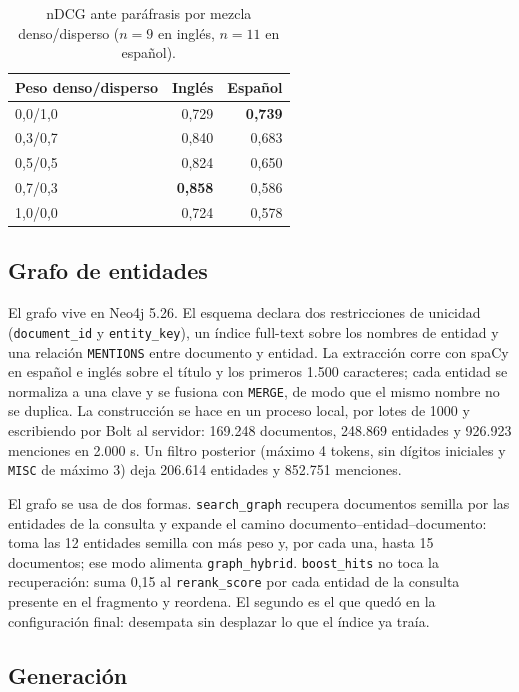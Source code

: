 \begin{table}[t]
\centering
\footnotesize
\caption{nDCG ante par\'afrasis por mezcla denso/disperso ($n=9$ en ingl\'es, $n=11$ en espa\~nol).}
\label{tab:parafrasis}
\begin{tabular}{lrr}
\toprule
Peso denso/disperso & Ingl\'es & Espa\~nol \\
\midrule
0,0/1,0 & 0,729 & \textbf{0,739} \\
0,3/0,7 & 0,840 & 0,683 \\
0,5/0,5 & 0,824 & 0,650 \\
0,7/0,3 & \textbf{0,858} & 0,586 \\
1,0/0,0 & 0,724 & 0,578 \\
\bottomrule
\end{tabular}
\end{table}

\subsection{Grafo de entidades}
\label{sec:grafo}

El grafo vive en Neo4j 5.26. El esquema declara dos restricciones de unicidad (\texttt{document\_id} y \texttt{entity\_key}), un \'indice full-text sobre los nombres de entidad y una relaci\'on \texttt{MENTIONS} entre documento y entidad. La extracci\'on corre con spaCy en espa\~nol e ingl\'es sobre el t\'itulo y los primeros 1.500 caracteres; cada entidad se normaliza a una clave y se fusiona con \texttt{MERGE}, de modo que el mismo nombre no se duplica. La construcci\'on se hace en un proceso local, por lotes de 1000 y escribiendo por Bolt al servidor: 169.248 documentos, 248.869 entidades y 926.923 menciones en 2.000 s. Un filtro posterior (m\'aximo 4 tokens, sin d\'igitos iniciales y \texttt{MISC} de m\'aximo 3) deja 206.614 entidades y 852.751 menciones.

El grafo se usa de dos formas. \texttt{search\_graph} recupera documentos semilla por las entidades de la consulta y expande el camino documento--entidad--documento: toma las 12 entidades semilla con m\'as peso y, por cada una, hasta 15 documentos; ese modo alimenta \texttt{graph\_hybrid}. \texttt{boost\_hits} no toca la recuperaci\'on: suma 0,15 al \texttt{rerank\_score} por cada entidad de la consulta presente en el fragmento y reordena. El segundo es el que qued\'o en la configuraci\'on final: desempata sin desplazar lo que el \'indice ya tra\'ia.

\subsection{Generaci\'on}
\label{sec:generacion}

